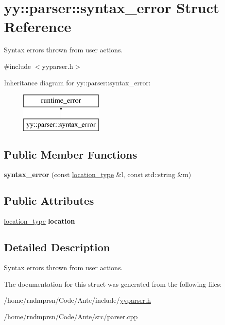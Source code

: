 \hypertarget{structyy_1_1parser_1_1syntax__error}{}\section{yy\+:\+:parser\+:\+:syntax\+\_\+error Struct Reference}
\label{structyy_1_1parser_1_1syntax__error}


Syntax errors thrown from user actions.  




{\ttfamily \#include $<$yyparser.\+h$>$}

Inheritance diagram for yy\+:\+:parser\+:\+:syntax\+\_\+error\+:\begin{figure}[H]
\begin{center}
\leavevmode
\includegraphics[height=2.000000cm]{structyy_1_1parser_1_1syntax__error}
\end{center}
\end{figure}
\subsection*{Public Member Functions}
\begin{DoxyCompactItemize}
\item 
\mbox{\label{structyy_1_1parser_1_1syntax__error_aa40bb3085ae32f3ec5a42e2a01736cd4}} 
{\bfseries syntax\+\_\+error} (const \hyperlink{classyy_1_1parser_a6cee0517f5ed9774dd68ee189b62e454}{location\+\_\+type} \&l, const std\+::string \&m)
\end{DoxyCompactItemize}
\subsection*{Public Attributes}
\begin{DoxyCompactItemize}
\item 
\mbox{\label{structyy_1_1parser_1_1syntax__error_a18f10cd4bd4c27a2fba391a67fef856a}} 
\hyperlink{classyy_1_1parser_a6cee0517f5ed9774dd68ee189b62e454}{location\+\_\+type} {\bfseries location}
\end{DoxyCompactItemize}


\subsection{Detailed Description}
Syntax errors thrown from user actions. 

The documentation for this struct was generated from the following files\+:\begin{DoxyCompactItemize}
\item 
/home/rndmprsn/\+Code/\+Ante/include/\hyperlink{yyparser_8h}{yyparser.\+h}\item 
/home/rndmprsn/\+Code/\+Ante/src/parser.\+cpp\end{DoxyCompactItemize}
